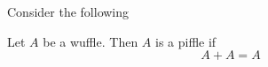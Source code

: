Consider the following
\begin{theorem}
  Let $A$ be a wuffle. Then $A$ is a piffle if
  \begin{equation*}
    A + A = A
  \end{equation*}
\end{theorem}
